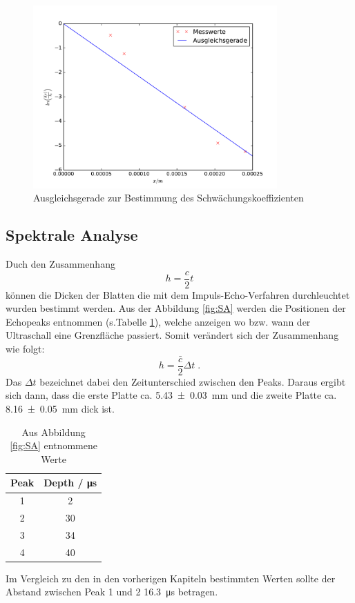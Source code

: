 \begin{figure}
  \centering
  \includegraphics[height = 7cm]{plots/alphaplot.pdf}
  \caption{Ausgleichsgerade zur Bestimmung des Schwächungskoeffizienten}
  \label{fig:alpha}
\end{figure}

\FloatBarrier
\subsection{Spektrale Analyse}
Duch den Zusammenhang
\begin{equation*}
h = \frac{c}{2} t
\end{equation*}
können die Dicken der Blatten die mit dem Impuls-Echo-Verfahren durchleuchtet
wurden bestimmt werden. Aus der Abbildung \ref{fig:SA} werden die Positionen
der Echopeaks entnommen (s.Tabelle \ref{tab:SAW}), welche anzeigen wo bzw. wann der Ultraschall eine
Grenzfläche passiert. Somit verändert sich der Zusammenhang wie folgt:
\begin{equation*}
  h = \frac{\bar{c}}{2} \Delta t \; .
\end{equation*}
Das $\Delta t $ bezeichnet dabei den Zeitunterschied zwischen den Peaks.
Daraus ergibt sich dann, dass die erste Platte ca. \SI{5.43(3)}{\milli\meter}
und die zweite Platte ca. \SI{8.16(5)}{\milli\meter} dick ist.
\begin{table}
  \centering
  \caption{Aus Abbildung \ref{fig:SA} entnommene Werte}
  \begin{tabular}{c c}
    \toprule
    Peak & Depth  / \si{\micro\second}\\
    \midrule
    1 & 2 \\
    2 & 30 \\
    3 & 34 \\
    4 & 40 \\
    \bottomrule
  \end{tabular}
\label{tab:SAW}
\end{table}
\FloatBarrier
Im Vergleich zu den in den vorherigen Kapiteln bestimmten Werten sollte
der Abstand zwischen Peak 1 und 2 \SI{16.3}{\micro\second} betragen.

